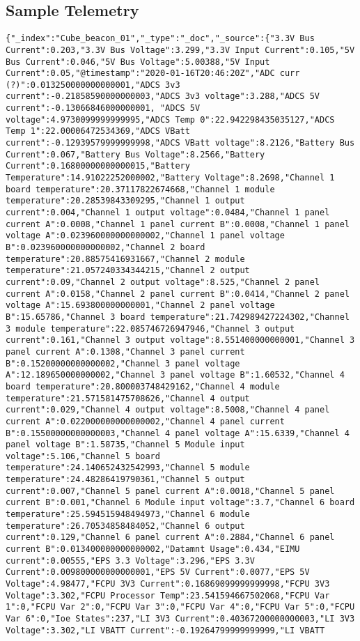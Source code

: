 \subsection{Sample Telemetry}

\begin{lstlisting}
{"_index":"Cube_beacon_01","_type":"_doc","_source":{"3.3V Bus Current":0.203,"3.3V Bus Voltage":3.299,"3.3V Input Current":0.105,"5V Bus Current":0.046,"5V Bus Voltage":5.00388,"5V Input Current":0.05,"@timestamp":"2020-01-16T20:46:20Z","ADC curr (?)":0.013250000000000001,"ADCS 3v3 current":-0.21858590000000003,"ADCS 3v3 voltage":3.288,"ADCS 5V current":-0.13066846000000001, "ADCS 5V voltage":4.9730099999999995,"ADCS Temp 0":22.942298435035127,"ADCS Temp 1":22.00006472534369,"ADCS VBatt current":-0.12939579999999998,"ADCS VBatt voltage":8.2126,"Battery Bus Current":0.067,"Battery Bus Voltage":8.2566,"Battery Current":0.16800000000000015,"Battery Temperature":14.91022252000002,"Battery Voltage":8.2698,"Channel 1 board temperature":20.37117822674668,"Channel 1 module temperature":20.28539843309295,"Channel 1 output current":0.004,"Channel 1 output voltage":0.0484,"Channel 1 panel current A":0.0008,"Channel 1 panel current B":0.0008,"Channel 1 panel voltage A":0.023960000000000002,"Channel 1 panel voltage B":0.023960000000000002,"Channel 2 board temperature":20.88575416931667,"Channel 2 module temperature":21.057240334344215,"Channel 2 output current":0.09,"Channel 2 output voltage":8.525,"Channel 2 panel current A":0.0158,"Channel 2 panel current B":0.0414,"Channel 2 panel voltage A":15.693800000000001,"Channel 2 panel voltage B":15.65786,"Channel 3 board temperature":21.742989427224302,"Channel 3 module temperature":22.085746726947946,"Channel 3 output current":0.161,"Channel 3 output voltage":8.551400000000001,"Channel 3 panel current A":0.1308,"Channel 3 panel current B":0.15200000000000002,"Channel 3 panel voltage A":12.189650000000002,"Channel 3 panel voltage B":1.60532,"Channel 4 board temperature":20.800003748429162,"Channel 4 module temperature":21.571581475708626,"Channel 4 output current":0.029,"Channel 4 output voltage":8.5008,"Channel 4 panel current A":0.022000000000000002,"Channel 4 panel current B":0.15500000000000003,"Channel 4 panel voltage A":15.6339,"Channel 4 panel voltage B":1.58735,"Channel 5 Module input voltage":5.106,"Channel 5 board temperature":24.140652432542993,"Channel 5 module temperature":24.48286419790361,"Channel 5 output current":0.007,"Channel 5 panel current A":0.0018,"Channel 5 panel current B":0.001,"Channel 6 Module input voltage":3.7,"Channel 6 board temperature":25.594515948494973,"Channel 6 module temperature":26.70534858484052,"Channel 6 output current":0.129,"Channel 6 panel current A":0.2884,"Channel 6 panel current B":0.013400000000000002,"Datamnt Usage":0.434,"EIMU current":0.00555,"EPS 3.3 Voltage":3.296,"EPS 3.3V Current":0.009800000000000001,"EPS 5V Current":0.0077,"EPS 5V Voltage":4.98477,"FCPU 3V3 Current":0.16869099999999998,"FCPU 3V3 Voltage":3.302,"FCPU Processor Temp":23.541594667502068,"FCPU Var 1":0,"FCPU Var 2":0,"FCPU Var 3":0,"FCPU Var 4":0,"FCPU Var 5":0,"FCPU Var 6":0,"Ioe States":237,"LI 3V3 Current":0.40367200000000003,"LI 3V3 Voltage":3.302,"LI VBATT Current":-0.19264799999999999,"LI VBATT 
\end{lstlisting}
